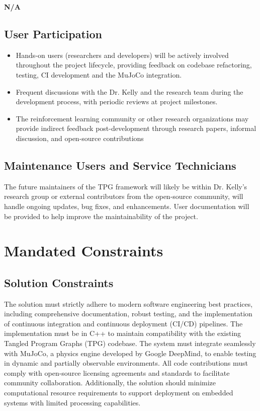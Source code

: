 \documentclass[12pt]{article}
\begin{document}
\textbf{N/A}

\subsection{User Participation}
\begin{itemize}
  \item Hands-on users (researchers and developers) will be actively involved throughout the project lifecycle, providing feedback on codebase refactoring, testing, CI development and the MuJoCo integration.


  \item Frequent discussions with the Dr. Kelly and the research team during the development process, with periodic reviews at project milestones.

  \item The reinforcement learning community or other research organizations may provide indirect feedback post-development through research papers, informal discussion, and open-source contributions


  \end{itemize}
\subsection{Maintenance Users and Service Technicians}
The future maintainers of the TPG framework will likely be within Dr. Kelly’s research group or external contributors from the open-source community, will handle ongoing updates, bug fixes, and enhancements. User documentation will be provided to help improve the maintainability of the project.


\section{Mandated Constraints}
\subsection{Solution Constraints}
The solution must strictly adhere to modern software engineering best practices, including comprehensive documentation, robust testing, and the implementation of continuous integration and continuous deployment (CI/CD) pipelines. The implementation must be in C++ to maintain compatibility with the existing Tangled Program Graphs (TPG) codebase. The system must integrate seamlessly with MuJoCo, a physics engine developed by Google DeepMind, to enable testing in dynamic and partially observable environments. All code contributions must comply with open-source licensing agreements and standards to facilitate community collaboration. Additionally, the solution should minimize computational resource requirements to support deployment on embedded systems with limited processing capabilities.
\end{document}
